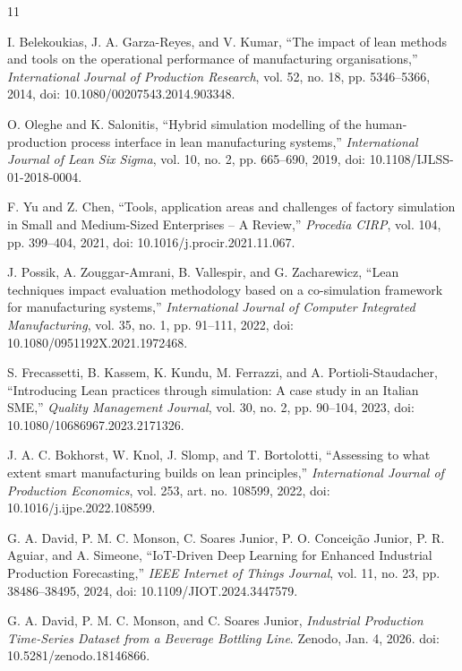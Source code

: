 \documentclass[12pt,a4paper]{article}
\begin{document}
\begin{thebibliography}{11}

I. Belekoukias, J. A. Garza-Reyes, and V. Kumar, ``The impact of lean methods and tools on the operational performance of manufacturing organisations,'' \emph{International Journal of Production Research}, vol. 52, no. 18, pp. 5346--5366, 2014, doi: 10.1080/00207543.2014.903348.

O. Oleghe and K. Salonitis, ``Hybrid simulation modelling of the human-production process interface in lean manufacturing systems,'' \emph{International Journal of Lean Six Sigma}, vol. 10, no. 2, pp. 665--690, 2019, doi: 10.1108/IJLSS-01-2018-0004.

F. Yu and Z. Chen, ``Tools, application areas and challenges of factory simulation in Small and Medium-Sized Enterprises -- A Review,'' \emph{Procedia CIRP}, vol. 104, pp. 399--404, 2021, doi: 10.1016/j.procir.2021.11.067.

J. Possik, A. Zouggar-Amrani, B. Vallespir, and G. Zacharewicz, ``Lean techniques impact evaluation methodology based on a co-simulation framework for manufacturing systems,'' \emph{International Journal of Computer Integrated Manufacturing}, vol. 35, no. 1, pp. 91--111, 2022, doi: 10.1080/0951192X.2021.1972468.

S. Frecassetti, B. Kassem, K. Kundu, M. Ferrazzi, and A. Portioli-Staudacher, ``Introducing Lean practices through simulation: A case study in an Italian SME,'' \emph{Quality Management Journal}, vol. 30, no. 2, pp. 90--104, 2023, doi: 10.1080/10686967.2023.2171326.

J. A. C. Bokhorst, W. Knol, J. Slomp, and T. Bortolotti, ``Assessing to what extent smart manufacturing builds on lean principles,'' \emph{International Journal of Production Economics}, vol. 253, art. no. 108599, 2022, doi: 10.1016/j.ijpe.2022.108599.

G. A. David, P. M. C. Monson, C. Soares Junior, P. O. Concei\c{c}\~ao Junior, P. R. Aguiar, and A. Simeone, ``IoT-Driven Deep Learning for Enhanced Industrial Production Forecasting,'' \emph{IEEE Internet of Things Journal}, vol. 11, no. 23, pp. 38486--38495, 2024, doi: 10.1109/JIOT.2024.3447579.

G. A. David, P. M. C. Monson, and C. Soares Junior, \emph{Industrial Production Time-Series Dataset from a Beverage Bottling Line}. Zenodo, Jan. 4, 2026. doi: 10.5281/zenodo.18146866.


\end{thebibliography}
\end{document}
